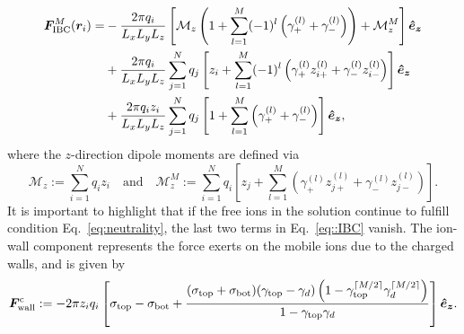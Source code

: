 \begin{equation}\label{eq::IBC}
\begin{split}
\bm{F}_{\text{IBC}}^{M}(\bm{r}_i)=&-\frac{2\pi q_{i}}{L_xL_yL_z}\left[\mathcal{M}_{z}\left(1+\sum_{l=1}^{M}(-1)^{l}\left(\gamma_{+}^{(l)}+\gamma_{-}^{(l)}\right)\right)+\mathcal{M}_{z}^{M}\right]\boldsymbol{\hat e_z}\\
&+\frac{2\pi q_i}{L_xL_yL_z}\sum_{j=1}^{N}q_j\left[z_i+\sum_{l=1}^{M}(-1)^{l}\left(\gamma_{+}^{(l)}z_{i+}^{(l)}+\gamma_{-}^{(l)}z_{i-}^{(l)}\right)\right]\boldsymbol{\hat e_z}\\
&+\frac{2\pi q_iz_i}{L_xL_yL_z}\sum_{j=1}^{N}q_j\left[1+\sum_{l=1}^{M}\left(\gamma_{+}^{(l)}+\gamma_{-}^{(l)}\right)\right]\boldsymbol{\hat e_z},
\end{split}
\end{equation}
where the $z$-direction dipole moments are defined via
\begin{equation}
\mathcal{M}_{z}:=\sum_{i=1}^{N}q_iz_i\quad\text{and}\quad \mathcal{M}_{z}^{M}:=\sum_{i=1}^{N}q_i\left[z_{j}+\sum_{l=1}^{M}\left(\gamma_{+}^{(l)}z_{j+}^{(l)}+\gamma_{-}^{(l)}z_{j-}^{(l)}\right)\right].
\end{equation}
It is important to highlight that if the free ions in the solution continue to fulfill condition Eq.~\eqref{eq:neutrality}, the last two terms in Eq.~\eqref{eq::IBC} vanish. 
The ion-wall component represents the force exerts on the mobile ions due to the charged walls, and is given by
\begin{equation}
\bm{F}_{\text{wall}}^{\text{c}}:=-2\pi z_{i}q_{i}\left[\sigma_{\text{top}}-\sigma_{\text{bot}}+\frac{(\sigma_{\text{top}}+\sigma_{\text{bot}})(\gamma_{\text{top}}-\gamma_{d})\left(1-\gamma_{\text{top}}^{\lceil M/2 \rceil}\gamma_{d}^{\lceil M/2 \rceil}\right)}{1-\gamma_{\text{top}}\gamma_{d}}\right]\boldsymbol{\hat e_z}.
\end{equation}


